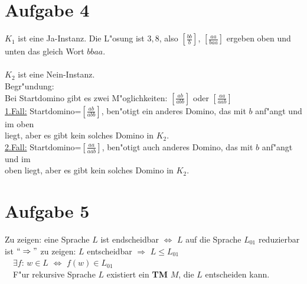 \documentclass[a4paper,11pt]{scrartcl}
\begin{document}
	

	
	
	\section*{Aufgabe 4}
		$K_1$ ist eine Ja-Instanz. Die L"osung ist $3,8$, also  $\left[ \frac{bb}{b} \right]$, $\left[ \frac{aa}{baa} \right]$ ergeben oben und unten das gleich Wort $bbaa$.\\ \\
		$K_2$ ist eine Nein-Instanz. \\ 
		Begr"undung: \\
		Bei Startdomino gibt es zwei M"oglichkeiten: $\left[ \frac{ab}{abb} \right]$ oder $\left[ \frac{aa}{aab} \right]$ \\
		\underline{1.Fall:} Startdomino=$\left[ \frac{ab}{abb} \right]$, ben"otigt ein anderes Domino, das mit $b$ anf"angt und im oben\\
		\indent \indent \indent liegt, aber es gibt kein solches Domino in $K_2$.\\
		\underline{2.Fall:} Startdomino=$\left[ \frac{aa}{aab} \right]$, ben"otigt auch anderes Domino, das mit $b$ anf"angt und im\\
				\indent \indent \indent oben liegt, aber es gibt kein solches Domino in $K_2$.

		
	
		
	\section*{Aufgabe 5}
	Zu zeigen: eine Sprache $L$ ist endscheidbar $\iff$ $L$ auf die Sprache $L_{01}$ reduzierbar ist
	\textbf{$``\Rightarrow"$} zu zeigen: $L$ entscheidbar $\Rightarrow$ $L \le L_{01}$\\
	\indent \indent \ \ $\exists f $: $w \in L$ $\iff$ $f(w) \in L_{01}$\\
	\indent \indent \ \ F"ur rekursive Sprache $L$ existiert ein \textbf{TM} $M$, die $L$ entscheiden kann.\\ \\
	    
\end{document}

